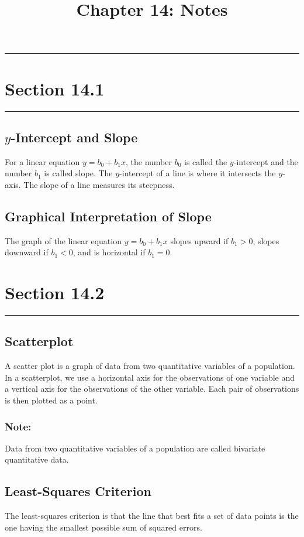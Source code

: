 \documentclass[12pt]{article}
\title{Chapter 14: Notes}
\author{}
\begin{document}
    \maketitle

    \noindent\rule{\textwidth}{0.4pt}
    \section*{Section 14.1}
    \noindent\rule{\textwidth}{0.4pt}
        \subsection*{$y$-Intercept and Slope}
            For a linear equation $y=b_0 + b_1x$, the number $b_0$ is called the $y$-intercept
            and the number $b_1$ is called slope. The $y$-intercept of a line is where it
            intersects the $y$-axis. The slope of a line measures its steepness.
        \subsection*{Graphical Interpretation of Slope}
            The graph of the linear equation $y=b_0 + b_1x$ slopes upward if $b_1 > 0$, slopes
            downward if $b_1 < 0$, and is horizontal if $b_1 = 0$.

    \section*{Section 14.2}
    \noindent\rule{\textwidth}{0.4pt}
        \subsection*{Scatterplot}
            A scatter plot is a graph of data from two quantitative variables of a population.
            In a scatterplot, we use a horizontal axis for the observations of one variable
            and a vertical axis for the observations of the other variable. Each pair of
            observations is then plotted as a point.
            \subsubsection*{Note:}
                Data from two quantitative variables of a population are called bivariate
                quantitative data.
        \subsection*{Least-Squares Criterion}
            The least-squares criterion is that the line that best fits a set of data points
            is the one having the smallest possible sum of squared errors.
\end{document}
